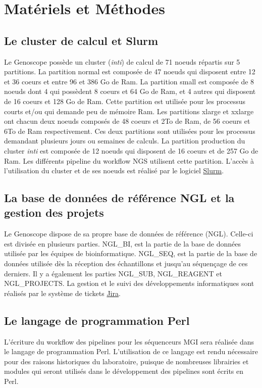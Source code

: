 \section{Matériels et Méthodes}
\subsection{Le cluster de calcul et Slurm}
Le Genoscope possède un cluster (\emph{inti}) de calcul de 71 noeuds répartis sur 5 partitions. La partition \og normal\fg{} est composée de 47 noeuds qui disposent entre 12 et 36 coeurs et entre 96 et 386 Go de Ram. La partition \og small\fg{} est composée de 8 noeuds dont 4 qui possèdent 8 coeurs et 64 Go de Ram, et 4 autres qui disposent de 16 coeurs et 128 Go de Ram. Cette partition est utilisée pour les processus courts et/ou qui demande peu de mémoire Ram. Les partitions \og xlarge \fg{} et \og xxlarge\fg{} ont chacun deux noeuds composés de 48 coeurs et 2To de Ram, de 56 coeurs et 6To de Ram respectivement. Ces deux partitions sont utilisées pour les processus demandant plusieurs jours ou semaines de calculs.
La partition \og production\fg{} du cluster \emph{inti} est composée de 12 noeuds qui disposent de 16 coeurs et de 257 Go de Ram. Les différents pipeline du workflow NGS utilisent cette partition.
L'accès à l'utilisation du cluster et de ses noeuds est réalisé par le logiciel \href{https://slurm.schedmd.com/documentation.html}{Slurm}.

\subsection{La base de données de référence NGL et la gestion des projets}
Le Genoscope dispose de sa propre base de données de référence (NGL). Celle-ci est divisée en plusieurs parties. NGL\_BI, est la partie de la base de données utilisée par les équipes de bioinformatique. NGL\_SEQ, est la partie de la base de données utilisée dès la réception des échantillons et jusqu'au séquençage de ces derniers. Il y a également les parties NGL\_SUB, NGL\_REAGENT et NGL\_PROJECTS. La gestion et le suivi des développements informatiques sont réalisés par le système de tickets \href{https://www.atlassian.com/fr/software/jira}{Jira}.

\subsection{Le langage de programmation Perl}
L'écriture du workflow des pipelines pour les séquenceurs MGI sera réalisée dans le langage de programmation Perl. L'utilisation de ce langage est rendu nécessaire pour des raisons historiques du laboratoire, puisque de nombreuses librairies et modules qui seront utilisés dans le développement des pipelines sont écrits en Perl.\\

